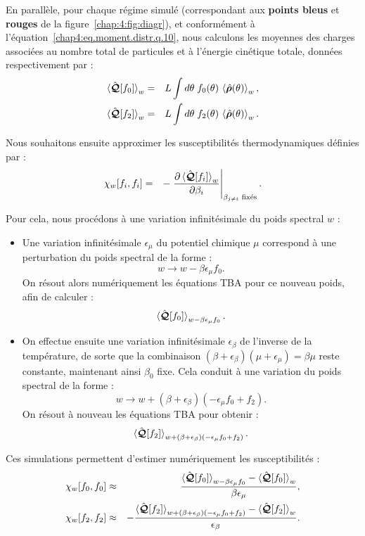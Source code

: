 \medskip
En parallèle, pour chaque régime simulé (correspondant aux {\bf points bleus} et {\bf rouges} de la figure~\ref{chap:4:fig:diagr}), et conformément à l’équation~\eqref{chap4:eq.moment.distr.q.10}, nous calculons les moyennes des charges associées au nombre total de particules et à l’énergie cinétique totale, données respectivement par :
\begin{eqnarray}
	\braket{\hat{\bm{\mathcal{Q}}}[f_0]}_w & = & L \int d\theta\; f_0(\theta)\, \braket{\hat{\bm{\rho}}(\theta)}_w,\\
	\braket{\hat{\bm{\mathcal{Q}}}[f_2]}_w & = & L \int d\theta\; f_2(\theta)\, \braket{\hat{\bm{\rho}}(\theta)}_w.
\end{eqnarray}

\medskip

Nous souhaitons ensuite approximer les susceptibilités thermodynamiques définies par :
\begin{eqnarray}
	\chi_w[f_i, f_i] & = & - \left. \frac{\partial \braket{\hat{\bm{\mathcal{Q}}}[f_i]}_w}{\partial \beta_i} \right|_{\beta_{j \neq i} \text{ fixés}}.
\end{eqnarray}

Pour cela, nous procédons à une variation infinitésimale du poids spectral $w$ :

\begin{itemize}[label =$\bullet$]
	\item Une variation infinitésimale $\epsilon_\mu$ du potentiel chimique $\mu$ correspond à une perturbation du poids spectral de la forme :  
	\[
	w \rightarrow w - \beta \epsilon_\mu f_0.
	\]
	On résout alors numériquement les équations TBA pour ce nouveau poids, afin de calculer :
	\[
	\braket{\hat{\bm{\mathcal{Q}}}[f_0]}_{w - \beta \epsilon_\mu f_0}.
	\]

	\item On effectue ensuite une variation infinitésimale $\epsilon_\beta$ de l’inverse de la température, de sorte que la combinaison \( (\beta + \epsilon_\beta)(\mu + \epsilon_\mu) = \beta \mu \) reste constante, maintenant ainsi $\beta_0$ fixe. Cela conduit à une variation du poids spectral de la forme :
	\[
	w \rightarrow w + (\beta + \epsilon_\beta)(- \epsilon_\mu f_0 + f_2).
	\]
	On résout à nouveau les équations TBA pour obtenir :
	\[
	\braket{\hat{\bm{\mathcal{Q}}}[f_2]}_{w + (\beta + \epsilon_\beta)(- \epsilon_\mu f_0 + f_2)}.
	\]
\end{itemize}

\medskip

Ces simulations permettent d’estimer numériquement les susceptibilités :
\begin{eqnarray}
	\chi_w[f_0, f_0]	 & \approx & \frac{\braket{\hat{\bm{\mathcal{Q}}}[f_0]}_{w - \beta \epsilon_\mu f_0} - \braket{\hat{\bm{\mathcal{Q}}}[f_0]}_w}{\beta \epsilon_\mu},	\\
	\chi_w[f_2, f_2]	 & \approx & - \frac{\braket{\hat{\bm{\mathcal{Q}}}[f_2]}_{w + (\beta + \epsilon_\beta)(- \epsilon_\mu f_0 + f_2)} - \braket{\hat{\bm{\mathcal{Q}}}[f_2]}_w}{\epsilon_\beta}.
\end{eqnarray}


